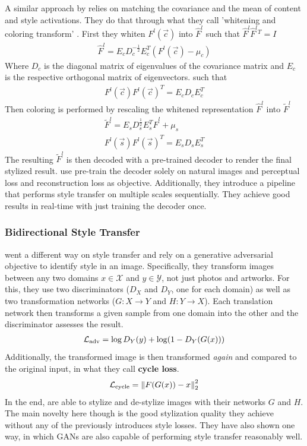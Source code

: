A similar approach by \citeauthor*{WCT} relies on matching the covariance and the mean of content and style activations.
They do that through what they call 'whitening and coloring transform' \cite{WCT}.
First they whiten $F^l(\vec{c})$ into $\hat{F}^l$ such that $\hat{F}^l \hat{F}^l{}^T = I$
\begin{align}
    \hat{F}^l = E_c D_c^{-\frac{1}{2}} E_c^T (F^l(\vec{c}) - \mu_c)
\end{align}
Where $D_c$ is the diagonal matrix of eigenvalues of the covariance matrix and $E_c$ is the respective orthogonal matrix of eigenvectors.
such that
\begin{align}
    F^l(\vec{c}) F^l(\vec{c})^T = E_c D_c E_c^T
\end{align}
Then coloring is performed by rescaling the whitened representation $\hat{F}^l$ into $\tilde{F}^l$
\begin{align}
    \tilde{F}^l = E_s D_s^{\frac{1}{2}} E_s^T \hat{F}^l + \mu_s \\
    F^l(\vec{s}) F^l(\vec{s})^T = E_s D_s E_s^T
\end{align}
The resulting $\tilde{F}^l$ is then decoded with a pre-trained decoder to render the final stylized result.
\citeauthor*{WCT} use pre-train the decoder solely on natural images and perceptual loss and reconstruction loss as objective.
Additionally, they introduce a pipeline that performs style transfer on multiple scales sequentially.
They achieve good results in real-time with just training the decoder once.

\subsubsection{Bidirectional Style Transfer}
\citeauthor*{CycleGAN} went a different way on style transfer and rely on a generative adversarial objective to identify style in an image.
Specifically, they transform images between any two domains $x \in \mathcal{X}$ and $y \in \mathcal{Y}$, not just photos and artworks.
For this, they use two discriminators ($D_X$ and $D_Y$, one for each domain) as well as two transformation networks ($G: X \rightarrow Y$ and $H: Y \rightarrow X$).
Each translation network then transforms a given sample from one domain into the other and the discriminator assesses the result.
\begin{align}
    \mathcal{L}_{\text{adv}} = \log D_Y(y) + \log(1 - D_Y(G(x)))
\end{align}
Additionally, the transformed image is then transformed \textit{again} and compared to the original input, in what they call \textbf{cycle loss}.
\begin{align}
    \mathcal{L}_{\text{cycle}} = \left\lVert F(G(x)) - x\right\rVert^2_2
\end{align}
In the end, \citeauthor*{CycleGAN} are able to stylize and de-stylize images with their networks $G$ and $H$.
The main novelty here though is the good stylization quality they achieve without any of the previously introduces style losses.
They have also shown one way, in which GANs are also capable of performing style transfer reasonably well.

